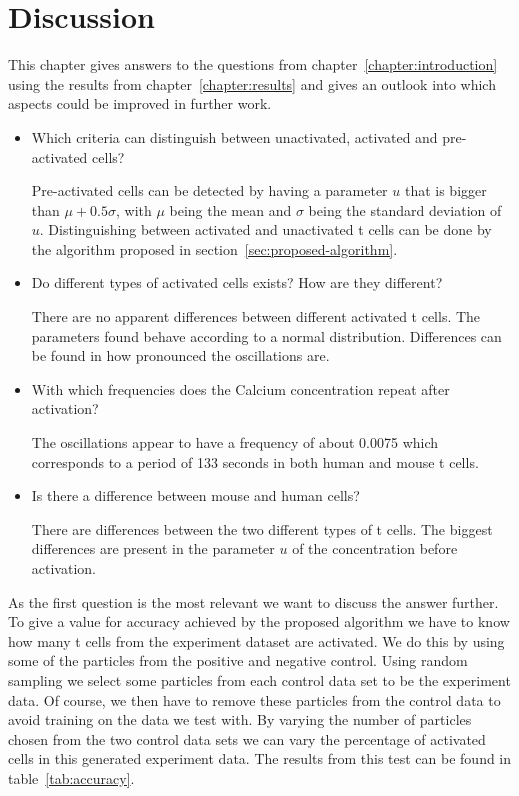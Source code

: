 \chapter{Discussion}
\label{chapter:conclusion}

This chapter gives answers to the questions from chapter~\ref{chapter:introduction} using the results from chapter~\ref{chapter:results} and gives an outlook into which aspects could be improved in further work.

\begin{itemize}
	\item Which criteria can distinguish between unactivated, activated and pre-activated cells?
	
	Pre-activated cells can be detected by having a parameter $u$ that is bigger than $\mu + 0.5 \sigma$, with $\mu$ being the mean and $\sigma$ being the standard deviation of $u$. Distinguishing between activated and unactivated t cells can be done by the algorithm proposed in section~\ref{sec:proposed-algorithm}.
	\item Do different types of activated cells exists? How are they different?
	
	There are no apparent differences between different activated t cells. The parameters found behave according to a normal distribution. Differences can be found in how pronounced the oscillations are.
	\item With which frequencies does the Calcium concentration repeat after activation?
	
	The oscillations appear to have a frequency of about 0.0075 which corresponds to a period of 133 seconds in both human and mouse t cells.
	\item Is there a difference between mouse and human cells?
	
	There are differences between the two different types of t cells. The biggest differences are present in the parameter $u$ of the \Calcium concentration before activation.
\end{itemize}

As the first question is the most relevant we want to discuss the answer further. To give a value for accuracy achieved by the proposed algorithm we have to know how many t cells from the experiment dataset are activated. We do this by using some of the particles from the positive and negative control. Using random sampling we select some particles from each control data set to be the experiment data. Of course, we then have to remove these particles from the control data to avoid training on the data we test with. By varying the number of particles chosen from the two control data sets we can vary the percentage of activated cells in this generated experiment data. The results from this test can be found in table~\ref{tab:accuracy}.

